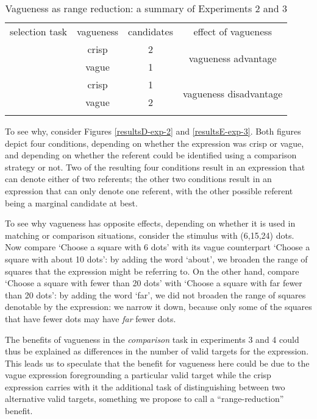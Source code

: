 \begin{table}[htbp]
\caption{Vagueness as range reduction: a summary of Experiments 2 and 3}
\label{Vagueness as range reduction}
\centering
\begin{tabular}{cccc}
\hline\noalign{\smallskip}
selection task 					& vagueness		& candidates	& effect of vagueness						\\
\noalign{\smallskip}\hline\noalign{\smallskip}
\multirow{ 2}{*}{comparison} 	& crisp 		& 2				& \multirow{ 2}{*}{vagueness advantage}  	\\
\noalign{\smallskip}\cline{2-3}\noalign{\smallskip}
								& vague			& 1				&                                           \\
\noalign{\smallskip}\hline\noalign{\smallskip}
\multirow{ 2}{*}{matching} 		& crisp 		& 1 			& \multirow{ 2}{*}{vagueness disadvantage}	\\
\noalign{\smallskip}\cline{2-3}\noalign{\smallskip}
								& vague			& 2				&								 			\\
\noalign{\smallskip}\hline
\end{tabular}
\end{table}

To see why, consider Figures \ref{resultsD-exp-2} and \ref{resultsE-exp-3}. Both figures depict four conditions, depending on whether the expression was crisp or vague, and depending on whether the referent could be identified using a comparison strategy or not. Two of the resulting four conditions result in an expression that can denote either of two referents; the other two conditions result in an expression that can only denote one referent, with the other possible referent being a marginal candidate at best.

To see why vagueness has opposite effects, depending on whether it is used in matching or comparison situations, consider the stimulus with (6,15,24) dots. Now compare `Choose a square with 6 dots' with its vague counterpart `Choose a square with about 10 dots': by adding the word `about', we broaden the range of squares that the expression might be referring to. On the other hand, compare `Choose a square with fewer than 20 dots' with `Choose a square with far fewer than 20 dots': by adding the word `far', we did not broaden the range of squares denotable by the expression: we narrow it down, because only some of the squares that have fewer dots may have {\em far} fewer dots.

The benefits of vagueness in the \emph{comparison} task in experiments 3 and 4 could thus be explained as differences in the number of valid targets for the expression. This leads us to speculate that the benefit for vagueness here could be due to the vague expression foregrounding a particular valid target while the crisp expression carries with it the additional task of distinguishing between two alternative valid targets, something we propose to call a ``range-reduction'' benefit.

